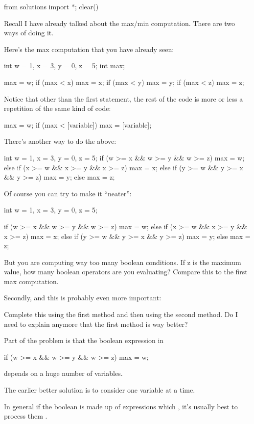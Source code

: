 \begin{python0}
from solutions import *; clear()
\end{python0}

Recall I have already talked about the max/min computation. There are
two ways of doing it.

Here's the max computation that you have already seen:
\begin{console}
int w = 1, x = 3, y = 0, z = 5;
int max;

max = w;
if (max < x)
   max = x;
if (max < y)
   max = y;
if (max < z)
   max = z; 
\end{console}

Notice that other than the first statement, the rest of the code is more
or less a repetition of the same kind of code:
\begin{console}
max = w;
if (max < [variable])
   max = [variable]; 
\end{console}

There's another  way to do the above:
\begin{consolethree}
int w = 1, x = 3, y = 0, z = 5;
if (w >= x && w >= y && w >= z)
    max = w;
else
{
     if (x >= w && x >= y && x >= z)
         max = x;
     else
     {
        if (y >= w && y >= x && y >= z)
            max = y;
        else
            max = z;
      }
}
\end{consolethree}

Of course you can try to make it ``neater'':
\begin{console}
int w = 1, x = 3, y = 0, z = 5;

if (w >= x && w >= y && w >= z)
    max = w;
else if (x >= w && x >= y && x >= z)
    max = x;
else if (y >= w && y >= x && y >= z)
    max = y;
else
    max = z;
\end{console}

But you are computing way too many boolean conditions. If z is the
maximum value, how many boolean operators are you evaluating? Compare
this to the first max computation.

Secondly, and this is probably even more important:

Complete this using the first method and then using the second method.
Do I need to explain anymore that the first method is way better?

Part of the problem is that the boolean expression in
\begin{console}
if (w >= x && w >= y && w >= z)
    max = w;  
\end{console}
depends on a huge number of variables.

The earlier better solution is to consider one variable at a time.

In general if the boolean is made up of expressions which , it's usually best to process them .

